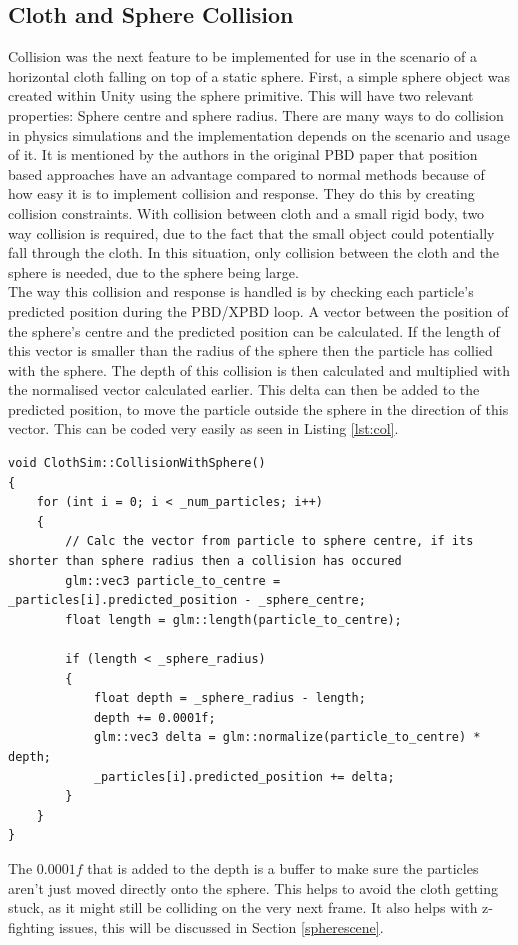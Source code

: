 \documentclass[12pt,a4paper]{article}
\begin{document}
\subsection{Cloth and Sphere Collision}
Collision was the next feature to be implemented for use in the scenario of a horizontal cloth falling on top of a static sphere. First, a simple sphere object was created within Unity using the sphere primitive. This will have two relevant properties: Sphere centre and sphere radius. There are many ways to do collision in physics simulations and the implementation depends on the scenario and usage of it. It is mentioned by the authors in the original PBD paper that position based approaches have an advantage compared to normal methods because of how easy it is to implement collision and response. They do this by creating collision constraints. With collision between cloth and a small rigid body, two way collision is required, due to the fact that the small object could potentially fall through the cloth. In this situation, only collision between the cloth and the sphere is needed, due to the sphere being large. \\

The way this collision and response is handled is by checking each particle's predicted position during the PBD/XPBD loop. A vector between the position of the sphere's centre and the predicted position can be calculated. If the length of this vector is smaller than the radius of the sphere then the particle has collied with the sphere. The depth of this collision is then calculated and multiplied with the normalised vector calculated earlier. This delta can then be added to the predicted position, to move the particle outside the sphere in the direction of this vector. This can be coded very easily as seen in Listing \ref{lst:col}. 
\begin{lstlisting}[caption={Sphere collision function},label={lst:col}]
void ClothSim::CollisionWithSphere()
{
	for (int i = 0; i < _num_particles; i++)
	{
		// Calc the vector from particle to sphere centre, if its shorter than sphere radius then a collision has occured
		glm::vec3 particle_to_centre = _particles[i].predicted_position - _sphere_centre;
		float length = glm::length(particle_to_centre);
		
		if (length < _sphere_radius)
		{
			float depth = _sphere_radius - length;
			depth += 0.0001f;
			glm::vec3 delta = glm::normalize(particle_to_centre) * depth;
			_particles[i].predicted_position += delta;
		}
	}
}

\end{lstlisting}
The $0.0001f$ that is added to the depth is a buffer to make sure the particles aren't just moved directly onto the sphere. This helps to avoid the cloth getting stuck, as it might still be colliding on the very next frame. It also helps with z-fighting issues, this will be discussed in Section \ref{spherescene}.
\end{document}
